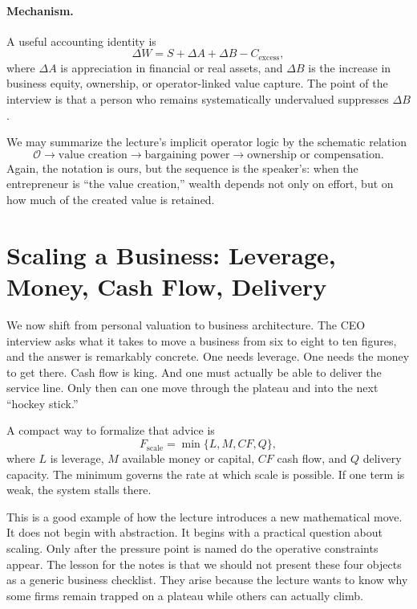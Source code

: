 \paragraph{Mechanism.}
A useful accounting identity is
\begin{equation}
\Delta W = S + \Delta A + \Delta B - C_{\text{excess}},
\end{equation}
where $\Delta A$ is appreciation in financial or real assets, and $\Delta B$ is the increase in business equity, ownership, or operator-linked value capture. The point of the interview is that a person who remains systematically undervalued suppresses $\Delta B$.

We may summarize the lecture's implicit operator logic by the schematic relation
\begin{equation}
\mathcal{O} \longrightarrow \text{value creation} \longrightarrow \text{bargaining power} \longrightarrow \text{ownership or compensation}.
\end{equation}
Again, the notation is ours, but the sequence is the speaker's: when the entrepreneur is ``the value creation,'' wealth depends not only on effort, but on how much of the created value is retained.

\section{Scaling a Business: Leverage, Money, Cash Flow, Delivery}

We now shift from personal valuation to business architecture. The CEO interview asks what it takes to move a business from six to eight to ten figures, and the answer is remarkably concrete. One needs leverage. One needs the money to get there. Cash flow is king. And one must actually be able to deliver the service line. Only then can one move through the plateau and into the next ``hockey stick.''

A compact way to formalize that advice is
\begin{equation}
F_{\text{scale}} = \min\{L,M,CF,Q\},
\end{equation}
where $L$ is leverage, $M$ available money or capital, $CF$ cash flow, and $Q$ delivery capacity. The minimum governs the rate at which scale is possible. If one term is weak, the system stalls there.

This is a good example of how the lecture introduces a new mathematical move. It does not begin with abstraction. It begins with a practical question about scaling. Only after the pressure point is named do the operative constraints appear. The lesson for the notes is that we should not present these four objects as a generic business checklist. They arise because the lecture wants to know why some firms remain trapped on a plateau while others can actually climb.

